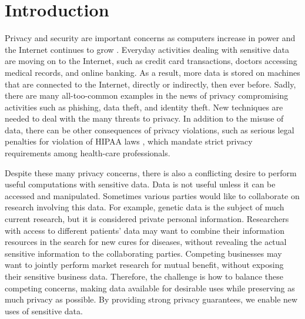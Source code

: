 
\chapter{Introduction}
\begin{quote}
%
\begin{comment}
\begin{quote}
As every man goes through life he fills in a number of forms for the
record, each containing a number of questions... There are thus hundreds
of little threads radiating from every man, millions of threads in
all. If these threads were suddenly to become visible, the whole sky
would look like a spider's web, and if they materialized as rubber
bands, buses; trams and even people would all lose the ability to
move, and the wind would be unable to carry torn-up newspapers or
autumn leaves along the streets of the city. They are not visible,
they are not material, but every man is constantly aware of their
existence.... Each man, permanently aware of his own invisible threads,
naturally develops a respect for the people who manipulate the threads.

--Alexander Solzhenitsyn, Cancer Ward, 1968.
\end{quote}

\end{comment}
{}
\end{quote}
Privacy and security are important concerns as computers increase
in power and the Internet continues to grow \cite{cra99,tur03}. Everyday
activities dealing with sensitive data are moving on to the Internet,
such as credit card transactions, doctors accessing medical records,
and online banking. As a result, more data is stored on machines that
are connected to the Internet, directly or indirectly, then ever before.
Sadly, there are many all-too-common examples in the news of
privacy compromising activities such as phishing, data theft, and
identity theft. New techniques are needed to deal with the many threats
to privacy. In addition to the misuse of data, there can be other
consequences of privacy violations, such as serious legal penalties
for violation of HIPAA laws \cite{hippa}, which mandate strict privacy
requirements among health-care professionals.

Despite these many privacy concerns, there is also a conflicting desire
to perform useful computations with sensitive data. Data is not useful
unless it can be accessed and manipulated. Sometimes various parties
would like to collaborate on research involving this data. For
example, genetic data is the subject of much current research, but
it is considered private personal information. Researchers with access
to different patients' data may want to combine their information
resources in the search for new cures for diseases, without revealing
the actual sensitive information to the collaborating parties. Competing
businesses may want to jointly perform market research for mutual
benefit, without exposing their sensitive business data. Therefore,
the challenge
is how to balance these competing concerns, making data available
for desirable uses while preserving as much privacy as possible.  By
providing strong privacy guarantees, we enable new uses of sensitive data.


